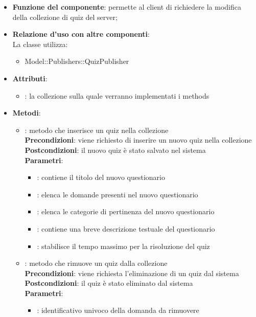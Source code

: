 \begin{itemize}
\item\textbf{Funzione del componente}: permette al client di richiedere la modifica della collezione di quiz del server;
	\item\textbf{Relazione d'uso con altre componenti}: \\
La classe utilizza:
	\begin{itemize}
		\item Model::Publishers::QuizPublisher
	\end{itemize}
\item\textbf{Attributi}:
	\begin{itemize}
		\item{}: la collezione sulla quale verranno implementati i methods\\
	\end{itemize}
\item\textbf{Metodi}:
	\begin{itemize}
		\item{}: metodo che inserisce un quiz nella collezione\\
		\textbf{Precondizioni}: viene richiesto di inserire un nuovo quiz nella collezione\\
		\textbf{Postcondizioni}: il nuovo quiz è stato salvato nel sistema\\
		\textbf{Parametri}:
			\begin{itemize}
				\item{}: contiene il titolo del nuovo questionario\\
				\item{}: elenca le domande presenti nel nuovo questionario\\
				\item{}: elenca le categorie di pertinenza del nuovo questionario\\
				\item{}: contiene una breve descrizione testuale del questionario\\
				\item{}: stabilisce il tempo massimo per la risoluzione del quiz\\
			\end{itemize}
		\item{}: metodo che rimuove un quiz dalla collezione\\
		\textbf{Precondizioni}: viene richiesta l'eliminazione di un quiz dal sistema\\
		\textbf{Postcondizioni}: il quiz è stato eliminato dal sistema\\
		\textbf{Parametri}:
			\begin{itemize}
				\item{}: identificativo univoco della domanda da rimuovere\\
			\end{itemize}
	\end{itemize}
\end{itemize}
\newpage

